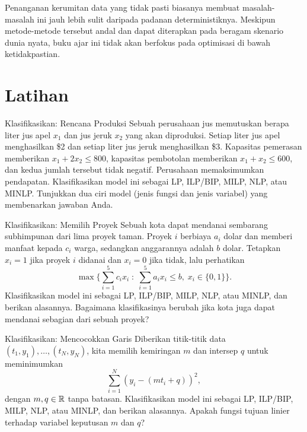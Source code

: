 Penanganan kerumitan data yang tidak pasti biasanya membuat masalah-masalah ini jauh lebih sulit daripada padanan deterministiknya. Meskipun metode-metode tersebut andal dan dapat diterapkan pada beragam skenario dunia nyata, buku ajar ini tidak akan berfokus pada optimisasi di bawah ketidakpastian.

\section{Latihan}


\begin{ex}{Klasifikasikan: Rencana Produksi}{}
 Sebuah perusahaan jus memutuskan berapa liter jus apel $x_1$ dan jus jeruk $x_2$ yang akan diproduksi. Setiap liter jus apel menghasilkan \$2 dan setiap liter jus jeruk menghasilkan \$3. Kapasitas pemerasan memberikan $x_1 + 2x_2 \leq 800$, kapasitas pembotolan memberikan $x_1 + x_2 \leq 600$, dan kedua jumlah tersebut tidak negatif. Perusahaan memaksimumkan pendapatan. Klasifikasikan model ini sebagai LP, ILP/BIP, MILP, NLP, atau MINLP. Tunjukkan dua ciri model (jenis fungsi dan jenis variabel) yang membenarkan jawaban Anda.
\end{ex}

\begin{ex}{Klasifikasikan: Memilih Proyek}{}
\label{ex:classify-projects}
 Sebuah kota dapat mendanai sembarang subhimpunan dari lima proyek taman. Proyek $i$ berbiaya $a_i$ dolar dan memberi manfaat kepada $c_i$ warga, sedangkan anggarannya adalah $b$ dolar. Tetapkan $x_i = 1$ jika proyek $i$ didanai dan $x_i = 0$ jika tidak, lalu perhatikan
\[
\max \Big\{ \sum_{i=1}^5 c_i x_i \;:\; \sum_{i=1}^5 a_i x_i \leq b, \; x_i \in \{0,1\} \Big\}.
\]
Klasifikasikan model ini sebagai LP, ILP/BIP, MILP, NLP, atau MINLP, dan berikan alasannya. Bagaimana klasifikasinya berubah jika kota juga dapat mendanai sebagian dari sebuah proyek?
\end{ex}

\begin{ex}{Klasifikasikan: Mencocokkan Garis}{}
 Diberikan titik-titik data $(t_1,y_1), \dots, (t_N,y_N)$, kita memilih kemiringan $m$ dan intersep $q$ untuk meminimumkan
\[
\sum_{i=1}^N (y_i - (mt_i + q))^2 ,
\]
dengan $m, q \in {\mathbb{R}}$ tanpa batasan. Klasifikasikan model ini sebagai LP, ILP/BIP, MILP, NLP, atau MINLP, dan berikan alasannya. Apakah fungsi tujuan linier terhadap variabel keputusan $m$ dan $q$?
\end{ex}

